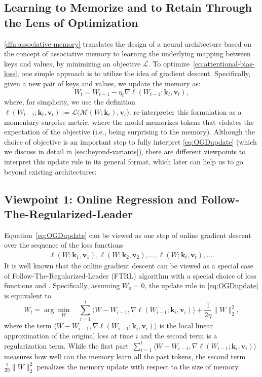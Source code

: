 \documentclass{article}
\newcommand{\citep}{\parencite}
\newcommand{\citet}{\textcite}
\newcommand{\vk}[0]{\mathbf{k}}
\newcommand{\vvv}[0]{\mathbf{v}}
\newcommand{\M}[0]{\mathcal{M}}
\theoremstyle{plain}
\theoremstyle{definition}
\theoremstyle{remark}
\begin{document}
\subsection{Learning to Memorize and to Retain Through the Lens of Optimization}
\autoref{dfn:associative-memory} translates the design of a neural architecture based on the concept of associative memory to learning the underlying mapping between keys and values, by minimizing an objective $\mathcal{L}$. To optimize~\autoref{eq:attentional-bias-loss}, one simple approach is to utilize the idea of gradient descent. Specifically, given a new pair of keys and values, we update the memory as:
\begin{equation} \label{eq:OGDupdate} 
    W_t = W_{t-1} - \eta_t \nabla \ell (W_{t-1};\vk_t, \vvv_t),  
\end{equation}
where, for simplicity, we use the definition $\ell (W_{t-1};\vk_t, \vvv_t) := \mathcal{L}(\M(W; \vk_t), \vvv_t$). 
\citet{behrouz2024titans} re-interpreter this formulation as a momentary surprise metric, where the model memorizes tokens that violates the expectation of the objective (i.e., being surprising to the memory). Although the choice of objective is an important step to fully interpret \autoref{eq:OGDupdate} (which we discuss in detail in \autoref{sec:beyond-variants}), there are different viewpoints to interpret this update rule in its general format, which later can help us to go beyond existing architectures:


\subsection{Viewpoint 1: Online Regression and Follow-The-Regularized-Leader}
Equation~\eqref{eq:OGDupdate} can be viewed as one step of online gradient descent over the sequence of the loss functions 
\begin{align}
    \ell(W;\vk_1, \vvv_1), \ell(W;\vk_2, \vvv_2), \ldots, \ell(W;\vk_t, \vvv_t), \ldots.
\end{align}
It is well known that the online gradient descent can be viewed as a special case of Follow-The-Regularized-Leader (FTRL) algorithm with a special choice of loss functions \citep[Chapter~2]{shalev2012online} and \citep{hazan2016introduction}. 
Specifically, assuming $W_0=0$, the update rule in \eqref{eq:OGDupdate} is equivalent to 
\begin{equation} \label{eq:OGDasFTRL}
W_{t} = \arg\min_{W}\quad \sum_{i=1}^t \langle W-W_{i-1} , \nabla \ell(W_{i-1};\vk_i, \vvv_i) \rangle  + \frac{1}{2\eta} \|W\|_2^2,
\end{equation}
where the term $\langle W-W_{i-1} , \nabla \ell(W_{i-1};\vk_i, \vvv_i) \rangle$ is the local linear approximation of the original loss at time $i$ and the second term is a regularization term.  While the first part~$ \sum_{i=1}^t \langle W-W_{i-1} , \nabla \ell(W_{i-1};\vk_i, \vvv_i) \rangle$ measures how well can the memory learn all the past tokens, the second term~
$\frac{1}{2\eta} \|W\|_2^2$ penalizes the memory update with respect to the size of memory. 
\end{document}
